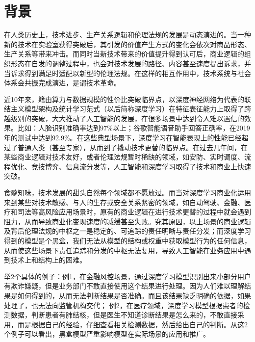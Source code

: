 \documentclass[letterpaper,10pt,english]{sphinxmanual}
\begin{document}
\section{背景}
\label{\detokenize{chapter_explainable_AI/explainable_ai:id1}}\label{\detokenize{chapter_explainable_AI/explainable_ai::doc}}
\sphinxAtStartPar
在人类历史上，技术进步、生产关系逻辑和伦理法规的发展是动态演进的。当一种新的技术在实验室获得突破后，其引发的价值产生方式的变化会依次对商品形态、生产关系等带来冲击。而同时当新技术带来的价值提升得到认可后，商业逻辑的组织形态在自发的调整过程中，也会对技术发展的路径、内容甚至速度提出诉求，并当诉求得到满足时适配以新型的伦理法规。在这样的相互作用中，技术系统与社会体系会共振完成演进，是谓技术革命。

\sphinxAtStartPar
近10年来，籍由算力与数据规模的性价比突破临界点，以深度神经网络为代表的联结主义模型架构及统计学习范式（以后简称深度学习）在特征表征能力上取得了跨越级别的突破，大大推动了人工智能的发展，在很多场景中达到令人难以置信的效果。比如：人脸识别准确率达到97\%以上；谷歌智能语音助手回答正确率，在2019年的测试中达到92.9\%。在这些典型场景下，深度学习在智能表现上的性能已经超过了普通人类（甚至专家），从而到了撬动技术更替的临界点。在过去几年间，在某些商业逻辑对技术友好，或者伦理法规暂时稀缺的领域，如安防、实时调度、流程优化、竞技博弈、信息流分发等，人工智能和深度学习取得了技术和商业上快速突破。

\sphinxAtStartPar
食髓知味，技术发展的甜头自然每个领域都不愿放过。而当对深度学习商业化运用来到某些对技术敏感、与人的生存或安全关系紧密的领域，如自动驾驶、金融、医疗和司法等高风险应用场景时，原有的商业逻辑在进行技术更替的过程中就会遇到阻力，从而导致商业化变现速度的减缓甚至失败。究其原因，以上场景的商业逻辑及背后伦理法规的中枢之一是稳定的、可追踪的责任明晰与责任分发；而深度学习得到的模型是个黑盒，我们无法从模型的结构或权重中获取模型行为的任何信息，从而使这些场景下责任追踪和分发的中枢无法复用，导致人工智能在业务应用中遇到技术上和结构上的困难。

\sphinxAtStartPar
举2个具体的例子：例1，在金融风控场景，通过深度学习模型识别出来小部分用户有欺诈嫌疑，但是业务部门不敢直接使用这个结果进行处理。因为人们难以理解结果是如何得到的，从而无法判断结果是否准确。而且该结果缺乏明确的依据，如果处理了，也无法向监管机构交代；
例2，在医疗领域，深度学习模型根据患者的检测数据，判断患者有肺结核，但是医生不知道诊断结果是怎么来的，不敢直接采用，而是根据自己的经验，仔细查看相关检测数据，然后给出自己的判断。从这2个例子可以看出，黑盒模型严重影响模型在实际场景的应用和推广。
\end{document}
